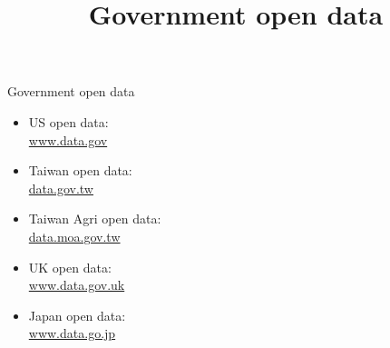 \documentclass[hyperref={pdfpagelabels=false}]{beamer}
\begin{document}
\title[]  
{Government open data}


\author 
{}

\institute{}






\date
{}


\begin{frame}{}
	\titlepage
\end{frame}






\begin{frame}{Government open data}
\begin{itemize} 
\item US open data: \\ \href{https://www.data.gov/local}{www.data.gov}  
\vspace{0.2cm}
\item Taiwan open data: \\ \href{https://data.gov.tw/}{data.gov.tw}  
\vspace{0.2cm}
\item Taiwan Agri open data:  \\ \href{https://data.moa.gov.tw/}{data.moa.gov.tw}  


\vspace{0.2cm}

\item UK open data: \\ \href{https://www.data.gov.uk}{www.data.gov.uk}
\vspace{0.2cm}
\item Japan open data: \\ \href{https://www.data.go.jp/}{www.data.go.jp}    




\end{itemize}
\end{frame}
\end{document}
